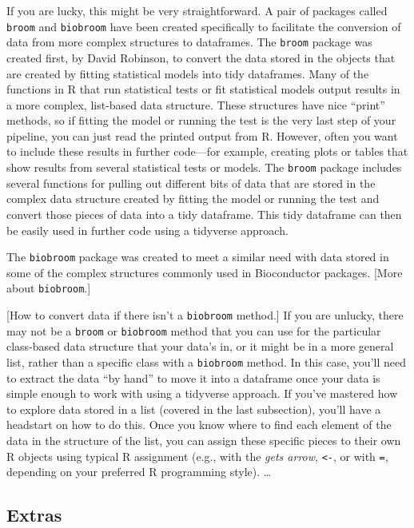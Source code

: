 \documentclass[]{tufte-book}
\begin{document}
If you are lucky, this might be very straightforward. A pair of packages called
\texttt{broom} and \texttt{biobroom} have been created specifically to facilitate the conversion
of data from more complex structures to dataframes. The \texttt{broom} package was
created first, by David Robinson, to convert the data stored in the objects that
are created by fitting statistical models into tidy dataframes. Many of the functions
in R that run statistical tests or fit statistical models output results in a
more complex, list-based data structure. These structures have nice ``print'' methods,
so if fitting the model or running the test is the very last step of your pipeline,
you can just read the printed output from R. However, often you want to include
these results in further code---for example, creating plots or tables that show
results from several statistical tests or models. The \texttt{broom} package includes
several functions for pulling out different bits of data that are stored in the
complex data structure created by fitting the model or running the test and convert
those pieces of data into a tidy dataframe. This tidy dataframe can then be
easily used in further code using a tidyverse approach.

The \texttt{biobroom} package was created to meet a similar need with data stored in some
of the complex structures commonly used in Bioconductor packages. {[}More about
\texttt{biobroom}.{]}

{[}How to convert data if there isn't a \texttt{biobroom} method.{]} If you are unlucky,
there may not be a \texttt{broom} or \texttt{biobroom} method that you can use for the particular
class-based data structure that your data's in, or it might be in a more general
list, rather than a specific class with a \texttt{biobroom} method. In this case, you'll
need to extract the data ``by hand'' to move it into a dataframe once your data is
simple enough to work with using a tidyverse approach. If you've mastered how to
explore data stored in a list (covered in the last subsection), you'll have a headstart
on how to do this. Once you know where to find each element of the data in the
structure of the list, you can assign these specific pieces to their own R objects
using typical R assignment (e.g., with the \emph{gets arrow}, \texttt{\textless{}-}, or with \texttt{=}, depending
on your preferred R programming style). \ldots{}

\hypertarget{extras}{%
\subsection{Extras}\label{extras}}
\end{document}
